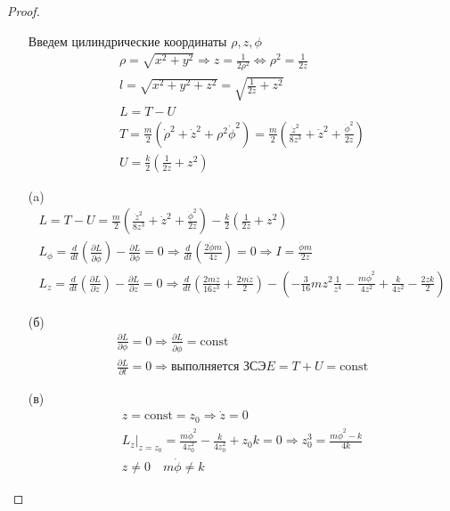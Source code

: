 \begin{proof}
\begin{itemize}
\item[]
    Введем цилиндрические координаты $\rho, z, \phi$
    \begin{gather*}
        \rho = \sqrt{x^2 + y^2} \Rightarrow
        z = \frac{1}{2 \rho^2} \Leftrightarrow \rho^2 = \frac{1}{2z}\\
        l = \sqrt{x^2 + y^2 + z^2} = \sqrt{\frac{1}{2z} + z^2}\\
        L = T - U\\
        T = \frac{m}{2}(\dot{\rho}^2 + \dot{z}^2 + \rho^2 \dot{\phi}^2)
        = \frac{m}{2}(\frac{\dot{z}^2}{8z^3} + \dot{z}^2 + \frac{\dot{\phi}^2}{2z})\\
        U = \frac{k}{2}(\frac{1}{2z} + z^2)
    \end{gather*}
\item[(a)]
    \begin{gather*}
        L = T - U = \frac{m}{2}(\frac{\dot{z}^2}{8z^3} + \dot{z}^2 + \frac{\dot{\phi}^2}{2z}) - \frac{k}{2}(\frac{1}{2z} + z^2)\\
        L_{\phi} = \frac{d}{dt}(\frac{\partial L}{\partial \dot{\phi}}) - \frac{\partial L}{\partial \phi} = 0 \Rightarrow
        \frac{d}{dt}(\frac{2 \dot{\phi} m}{4z}) = 0 \Rightarrow
        I = \frac{\dot{\phi} m}{2z}\\
        L_{z} = \frac{d}{dt}(\frac{\partial L}{\partial \dot{z}}) - \frac{\partial L}{\partial z} = 0 \Rightarrow
        \frac{d}{dt}(\frac{2m \dot{z}}{16 z^3} + \frac{2 m \dot{z}}{2}) - (-\frac{3}{16} mz^2 \frac{1}{z^4} - \frac{m \dot{\phi}^2}{4z^2} + \frac{k}{4z^2} - \frac{2zk}{2})
    \end{gather*}
\item[(б)]
    \begin{gather*}
        \frac{\partial L}{\partial \phi} = 0 \Rightarrow \frac{\partial L}{\partial \dot{\phi}} = \text{const}\\
        \frac{\partial L}{\partial t} = 0 \Rightarrow \text{выполняется ЗСЭ} E = T + U = \text{const}
    \end{gather*}
\item[(в)]
    \begin{gather*}
        z = \text{const} = z_0 \Rightarrow \dot{z} = 0\\
        L_{z}|_{z = z_0} = \frac{m \dot{\phi}^2}{4z_0^2} - \frac{k}{4z_0^2} + z_0 k = 0 \Rightarrow
        z_0^3 = \frac{m \dot{\phi}^2 - k}{4k}\\
        z \ne 0\quad m \dot{\phi} \ne k
    \end{gather*}
\end{itemize}
\end{proof}
\vskip 0.6in





